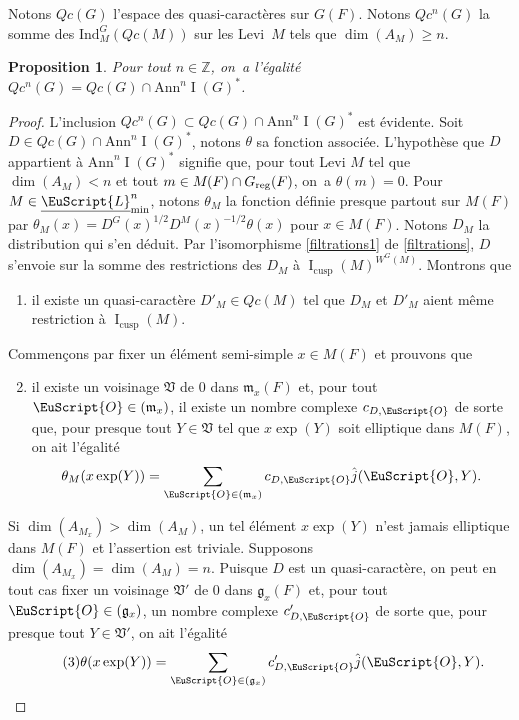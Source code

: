 \documentclass[JEP,XML,SOM,Unicode,francais]{cedram}
\let\mathcal \EuScript
\newcommand{\NoChangel}[1]{%
\expandafter\let\csname old\string#1\endcsname=#1
\let#1=\relax
\newcommand{#1}{\mathcode`l="716C\csname old\string#1\endcsname\mathcode`l="7160 }%
}
\newcommand{\frg}{\mathfrak{g}}
\newcommand{\mfrm}{\mathfrak{m}}
\newcommand{\frV}{\mathfrak{V}}
\newcommand{\Ann}{\mathrm{Ann}}
\newcommand{\cusp}{\mathrm{cusp}}
\newcommand{\rell}{\mathrm{ell}} \NoChangel{\rell}
\newcommand{\Ind}{\mathrm{Ind}}
\newcommand{\Nil}{\mathrm{Nil}} \NoChangel{\Nil}
\newcommand{\reg}{\mathrm{reg}}
\DeclareMathOperator{\rI}{I}
\newcommand{\cL}{\mathcal{L}}
\newcommand{\cO}{\mathcal{O}}
\newcommand{\ZZ}{\mathbb{Z}}
\theoremstyle{plain}
\newtheorem*{prop*}{Proposition}
\theoremstyle{definition}
\begin{document}
Notons $Qc(G)$ l'espace des quasi-caractères sur $G(F)$. Notons $Qc^n(G)$ la somme des $\Ind_{M}^G(Qc(M))$ sur les Levi~$M$ tels que $\dim(A_{M})\geq n$.

\begin{prop*}
Pour tout $n\in \ZZ$, on~a l'égalité
$Qc^n(G)=Qc(G)\cap \Ann^n\rI(G)^*$.
\end{prop*}

\begin{proof}
L'inclusion $Qc^n(G)\subset Qc(G)\cap \Ann^n\rI(G)^*$ est évidente. Soit $D\in Qc(G)\cap \Ann^n\rI(G)^*$, notons $\theta$ sa fonction associée. L'hypothèse que $D$ appartient à $\Ann^n\rI(G)^*$ signifie que, pour tout Levi $M$ tel que $\dim(A_{M})<n$ et tout $m\in M_{\rell}(F)\cap G_{\reg}(F)$, on~a $\theta(m)=0$. Pour $M\in \underline{\cL}_{\min}^n$, notons $\theta_{M}$ la fonction définie presque partout sur $M(F)$ par $\theta_{M}(x)=D^G(x)^{1/2}D^M(x)^{-1/2}\theta(x)$ pour $x\in M(F)$. Notons $D_{M}$ la distribution qui s'en déduit.
Par l'isomorphisme \eqref{filtrations1} de \ref{filtrations}, $D$ s'envoie sur la somme des restrictions des $D_{M}$ à $\rI_{\cusp}(M)^{W^G(M)}$. Montrons que
\begin{enumerate}
\item\label{filtrationsurlegroupe1}
il existe un quasi-caractère $D'_{M}\in Qc(M)$ tel que $D_{M}$ et $D'_{M}$ aient même restriction à $\rI_{\cusp}(M)$.
\end{enumerate}

Commençons par fixer un élément semi-simple $x\in M(F)$ et prouvons que
\begin{enumerate}\setcounter{enumi}{1}
\item\label{filtrationsurlegroupe2}
il existe un voisinage $\frV$ de $0$ dans $\mfrm_{x}(F)$ et, pour tout $\cO\in \Nil(\mfrm_{x})$, il existe un nombre complexe $c_{D,\cO}$ de sorte que, pour presque tout $Y\in \frV$ tel que $x \exp(Y)$ soit elliptique dans $M(F)$, on ait l'égalité
\[
\theta_{M}(x \exp(Y))=\sum_{\cO\in \Nil(\mfrm_{x})}c_{D,\cO}\hat{j}(\cO,Y).
\]
\end{enumerate}

Si $\dim(A_{M_{x}})> \dim(A_{M})$, un tel élément $x \exp(Y)$ n'est jamais elliptique dans $M(F)$ et l'assertion est triviale. Supposons $\dim(A_{M_{x}})=\dim(A_{M})=n$. Puisque $D$ est un quasi-caractère, on peut en tout cas fixer un voisinage $\frV'$ de $0$ dans $\frg_{x}(F)$ et, pour tout $\cO\in \Nil(\frg_{x})$, un nombre complexe $c'_{D,\cO}$ de sorte que, pour presque tout $Y\in \frV'$, on ait l'égalité
\begin{equation}\tag{3}\label{filtrationsurlegroupe3}
\theta(x \exp(Y))=\sum_{\cO\in \Nil(\frg_{x})}c'_{D,\cO}\hat{j}(\cO,Y).
\end{equation}


\end{proof}
\end{document}
